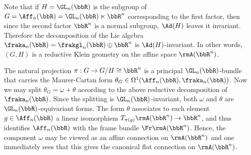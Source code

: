 \begin{rem}\label{rem 1.3.5 Cap}
    Note that if $H=\GL_n(\bbR)$ is the subgroup of $G=\Aff_n(\bbR)=\GL_n(\bbR)\ltimes \bbR^n$ corresponding to the first factor, then since the second factor $\bbR^n$ is a normal subgroup, $\Ad(H)$ leaves it invariant. Therefore the decomposition of the Lie algebra $\fraka_n(\bbR)=\frakgl_n(\bbR)\oplus \bbR^n$ is $\Ad(H)$-invariant. In other words, $(G,H)$ is a reductive Klein geometry on the affine space $\rmA(\bbR^n)$.

    The natural projection $\pi:G\to G\slash H\cong \bbR^n$ is a principal $\GL_n(\bbR)$-bundle that carries the Maurer-Cartan form $\theta_G\in\Omega^1(\Aff_n(\bbR),\fraka_n(\bbR))$. Now we may split $\theta_G=\omega+\theta$ according to the above reductive decomposition of $\fraka_n(\bbR)$. Since the splitting is $\GL_n(\bbR)$-invariant, both $\omega$ and $\theta$ are $\GL_n(\bbR)$-equivariant forms. The form $\theta$ associates to each element $g\in \Aff_n(\bbR)$ a linear isomorphism $T_{\pi(g)}\rmA(\bbR^n)\to \bbR^n$, and thus identifies $\Aff_n(\bbR)$ with the frame bundle $\Fr \rmA(\bbR^n)$. Hence, the component $\omega$ may be viewed as an affine connection on $\rmA(\bbR^n)$ and one immediately sees that this gives the canonical flat connection on $\rmA(\bbR^n)$.
\end{rem}

